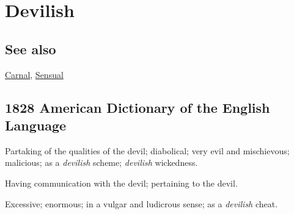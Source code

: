 \section{Devilish}
	\label{DEVILISH}
	
\subsection{See also}

	\hyperref[CARNAL]{Carnal}, \hyperref[SENSUAL]{Sensual}

\subsection{1828 American Dictionary of the English Language} %
	\label{DEVILISH-1828}

	\begin{compactitem}
		\item[1] Partaking of the qualities of the devil; diabolical; very evil and mischievous; malicious; as a \textit{devilish} scheme; \textit{devilish} wickedness.
		\item[2] Having communication with the devil; pertaining to the devil.
		\item[3] Excessive; enormous; in a vulgar and ludicrous sense; as a \textit{devilish} cheat.
	\end{compactitem}


	

	

